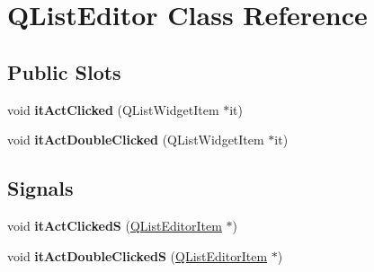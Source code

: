 \hypertarget{classQListEditor}{\section{\-Q\-List\-Editor \-Class \-Reference}
\label{classQListEditor}
}
\subsection*{\-Public \-Slots}
\begin{DoxyCompactItemize}
\item 
\hypertarget{classQListEditor_a7646e05181a114dd6e209c398e924fb6}{void {\bfseries it\-Act\-Clicked} (\-Q\-List\-Widget\-Item $\ast$it)}\label{classQListEditor_a7646e05181a114dd6e209c398e924fb6}

\item 
\hypertarget{classQListEditor_aaa67233bcc7e247efe7da4374eb72151}{void {\bfseries it\-Act\-Double\-Clicked} (\-Q\-List\-Widget\-Item $\ast$it)}\label{classQListEditor_aaa67233bcc7e247efe7da4374eb72151}

\end{DoxyCompactItemize}
\subsection*{\-Signals}
\begin{DoxyCompactItemize}
\item 
\hypertarget{classQListEditor_a0a6f9fbf755ad20aed536e448378ed29}{void {\bfseries it\-Act\-Clicked\-S} (\hyperlink{classQListEditorItem}{\-Q\-List\-Editor\-Item} $\ast$)}\label{classQListEditor_a0a6f9fbf755ad20aed536e448378ed29}

\item 
\hypertarget{classQListEditor_ae1faecd09505cd0ccdce71fe9becbc63}{void {\bfseries it\-Act\-Double\-Clicked\-S} (\hyperlink{classQListEditorItem}{\-Q\-List\-Editor\-Item} $\ast$)}\label{classQListEditor_ae1faecd09505cd0ccdce71fe9becbc63}

\end{DoxyCompactItemize}

